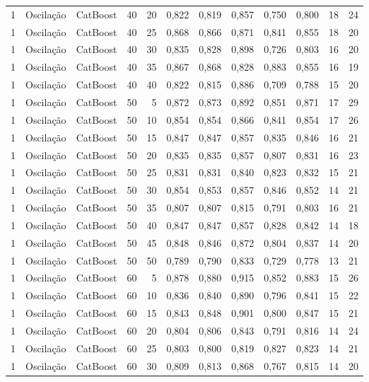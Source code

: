 \begin{longtable}{ccclrrrrrrrr}
1 & Oscilação & CatBoost & 40 & 20 & 0,822 & 0,819 & 0,857 & 0,750 & 0,800 & 18 & 24 \\
1 & Oscilação & CatBoost & 40 & 25 & 0,868 & 0,866 & 0,871 & 0,841 & 0,855 & 18 & 20 \\
1 & Oscilação & CatBoost & 40 & 30 & 0,835 & 0,828 & 0,898 & 0,726 & 0,803 & 16 & 20 \\
1 & Oscilação & CatBoost & 40 & 35 & 0,867 & 0,868 & 0,828 & 0,883 & 0,855 & 16 & 19 \\
1 & Oscilação & CatBoost & 40 & 40 & 0,822 & 0,815 & 0,886 & 0,709 & 0,788 & 15 & 20 \\
1 & Oscilação & CatBoost & 50 & 5 & 0,872 & 0,873 & 0,892 & 0,851 & 0,871 & 17 & 29 \\
1 & Oscilação & CatBoost & 50 & 10 & 0,854 & 0,854 & 0,866 & 0,841 & 0,854 & 17 & 26 \\
1 & Oscilação & CatBoost & 50 & 15 & 0,847 & 0,847 & 0,857 & 0,835 & 0,846 & 16 & 21 \\
1 & Oscilação & CatBoost & 50 & 20 & 0,835 & 0,835 & 0,857 & 0,807 & 0,831 & 16 & 23 \\
1 & Oscilação & CatBoost & 50 & 25 & 0,831 & 0,831 & 0,840 & 0,823 & 0,832 & 15 & 21 \\
1 & Oscilação & CatBoost & 50 & 30 & 0,854 & 0,853 & 0,857 & 0,846 & 0,852 & 14 & 21 \\
1 & Oscilação & CatBoost & 50 & 35 & 0,807 & 0,807 & 0,815 & 0,791 & 0,803 & 16 & 21 \\
1 & Oscilação & CatBoost & 50 & 40 & 0,847 & 0,847 & 0,857 & 0,828 & 0,842 & 14 & 18 \\
1 & Oscilação & CatBoost & 50 & 45 & 0,848 & 0,846 & 0,872 & 0,804 & 0,837 & 14 & 20 \\
1 & Oscilação & CatBoost & 50 & 50 & 0,789 & 0,790 & 0,833 & 0,729 & 0,778 & 13 & 21 \\
1 & Oscilação & CatBoost & 60 & 5 & 0,878 & 0,880 & 0,915 & 0,852 & 0,883 & 15 & 26 \\
1 & Oscilação & CatBoost & 60 & 10 & 0,836 & 0,840 & 0,890 & 0,796 & 0,841 & 15 & 22 \\
1 & Oscilação & CatBoost & 60 & 15 & 0,843 & 0,848 & 0,901 & 0,800 & 0,847 & 15 & 21 \\
1 & Oscilação & CatBoost & 60 & 20 & 0,804 & 0,806 & 0,843 & 0,791 & 0,816 & 14 & 24 \\
1 & Oscilação & CatBoost & 60 & 25 & 0,803 & 0,800 & 0,819 & 0,827 & 0,823 & 14 & 21 \\
1 & Oscilação & CatBoost & 60 & 30 & 0,809 & 0,813 & 0,868 & 0,767 & 0,815 & 14 & 20 \\

\end{longtable}
